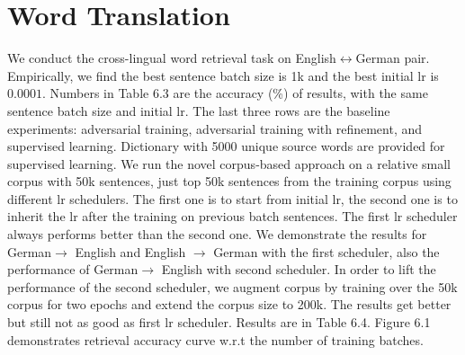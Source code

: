 \section{Word Translation}
We conduct the cross-lingual word retrieval task on English$\leftrightarrow$German pair. Empirically, we find the best sentence batch size is 1k and the best initial lr is $0.0001$. Numbers in Table 6.3 are the accuracy (\%) of results, with the same sentence batch size and initial lr. The last three rows are the baseline experiments: adversarial training, adversarial training with refinement, and supervised learning. Dictionary with 5000 unique source words are provided for supervised learning. We run the novel corpus-based approach on a relative small corpus with 50k sentences, just top 50k sentences from the training corpus using different lr schedulers. The first one is to start from initial lr, the second one is to inherit the lr after the training on previous batch sentences. The first lr scheduler always performs better than the second one. We demonstrate the results for German$\rightarrow$ English and English $\rightarrow$ German with the first scheduler, also the performance of  German$\rightarrow$ English with second scheduler. In order to lift the performance of the second scheduler, we augment corpus by training over the 50k corpus for two epochs and extend the corpus size to 200k. The results get better but still not as good as first lr scheduler. Results are in Table 6.4. Figure 6.1 demonstrates retrieval accuracy curve w.r.t the number of training batches.


